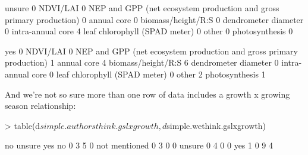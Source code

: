 \documentclass[11pt]{article}
\begin{document}
\begin{Schunk}
\begin{Soutput}
                                                                      unsure
                                                                           0
  NDVI/LAI                                                                 0
  NEP and GPP (net ecosystem production and gross primary production)      0
  annual core                                                              0
  biomass/height/R:S                                                       0
  dendrometer diameter                                                     0
  intra-annual core                                                        4
  leaf chlorophyll (SPAD meter)                                            0
  other                                                                    0
  photosynthesis                                                           0
                                                                     
                                                                      yes
                                                                        0
  NDVI/LAI                                                              0
  NEP and GPP (net ecosystem production and gross primary production)   1
  annual core                                                           4
  biomass/height/R:S                                                    6
  dendrometer diameter                                                  0
  intra-annual core                                                     0
  leaf chlorophyll (SPAD meter)                                         0
  other                                                                 2
  photosynthesis                                                        1
\end{Soutput}
\end{Schunk}


And we're not so sure more than one row of data includes a growth x growing season relationship:
\begin{Schunk}
\begin{Sinput}
> table(d$simple.authorsthink.gslxgrowth, d$simple.wethink.gslxgrowth)
\end{Sinput}
\begin{Soutput}
                  no unsure yes
  no            0  3      5   0
  not mentioned 0  3      0   0
  unsure        0  4      0   0
  yes           1  0      9   4
\end{Soutput}
\end{Schunk}
\end{document}
